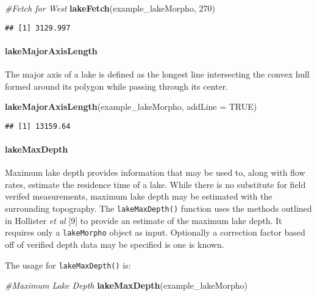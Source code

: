 \documentclass[11pt,]{article}
\newenvironment{Shaded}{\begin{snugshade}}{\end{snugshade}}
\newcommand{\KeywordTok}[1]{\textcolor[rgb]{0.13,0.29,0.53}{\textbf{{#1}}}}
\newcommand{\DataTypeTok}[1]{\textcolor[rgb]{0.13,0.29,0.53}{{#1}}}
\newcommand{\DecValTok}[1]{\textcolor[rgb]{0.00,0.00,0.81}{{#1}}}
\newcommand{\CommentTok}[1]{\textcolor[rgb]{0.56,0.35,0.01}{\textit{{#1}}}}
\newcommand{\OtherTok}[1]{\textcolor[rgb]{0.56,0.35,0.01}{{#1}}}
\newcommand{\NormalTok}[1]{{#1}}
\begin{document}
\begin{Shaded}
\begin{Highlighting}[]
\CommentTok{#Fetch for West}
\KeywordTok{lakeFetch}\NormalTok{(example_lakeMorpho, }\DecValTok{270}\NormalTok{)}
\end{Highlighting}
\end{Shaded}

\begin{verbatim}
## [1] 3129.997
\end{verbatim}

\paragraph{lakeMajorAxisLength}\label{lakemajoraxislength}

The major axis of a lake is defined as the longest line intersecting the
convex hull formed around its polygon while passing through its center.

\begin{Shaded}
\begin{Highlighting}[]
\KeywordTok{lakeMajorAxisLength}\NormalTok{(example_lakeMorpho, }\DataTypeTok{addLine =} \OtherTok{TRUE}\NormalTok{)}
\end{Highlighting}
\end{Shaded}

\begin{verbatim}
## [1] 13159.64
\end{verbatim}

\paragraph{lakeMaxDepth}\label{lakemaxdepth}

Maximum lake depth provides information that may be used to, along with
flow rates, estimate the residence time of a lake. While there is no
substitute for field verifed measurements, maximum lake depth may be
estimated with the surrounding topography. The \texttt{lakeMaxDepth()}
function uses the methods outlined in Hollister \emph{et al} {[}9{]} to
provide an estimate of the maximum lake depth. It requires only a
\texttt{lakeMorpho} object as input. Optionally a correction factor
based off of verified depth data may be specified is one is known.

The usage for \texttt{lakeMaxDepth()} is:

\begin{Shaded}
\begin{Highlighting}[]
\CommentTok{#Maximum Lake Depth}
\KeywordTok{lakeMaxDepth}\NormalTok{(example_lakeMorpho)}
\end{Highlighting}
\end{Shaded}
\end{document}
